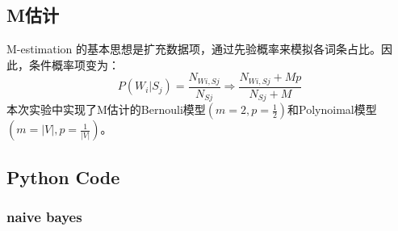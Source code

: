 \documentclass[UTF-8, a4paper, 11pt]{article}
\numberwithin{equation}{section}
\begin{document}
\subsection{M估计}
\label{m-estimation}
M-estimation 的基本思想是扩充数据项，通过先验概率来模拟各词条占比。因此，条件概率项变为：
\begin{equation}\label{ep:eqs}
  P(W_i|S_j) = \frac{N_{Wi,Sj}}{N_{Sj}} \Longrightarrow \frac{N_{Wi,Sj}+Mp}{N_{Sj}+M}
\end{equation}
本次实验中实现了M估计的Bernouli模型$(m=2,p=\frac{1}{2})$和Polynoimal模型$(m=|V|, p=\frac{1}{|V|})$。
\subsection{Python Code}
\subsubsection{naive bayes}
\end{document}

